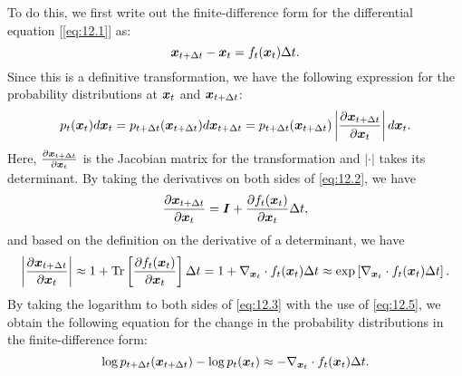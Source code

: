 To do this, we first write out the finite-difference form for the differential equation [\cref{eq:12.1}] as:
\begin{equation}
\label{eq:12.2}
\bm{x}_{t+\Delta t}-\bm{x}_t=f_t(\bm{x}_{t})\Delta t.
\end{equation}
Since this is a definitive transformation, we have the following expression for the probability distributions at $\bm{x}_{t}$ and $\bm{x}_{t+\Delta t}$:
\begin{equation}
    \label{eq:12.3}
    p_t(\bm{x}_{t})d\bm{x}_t=p_{t+\Delta t}(\bm{x}_{t+\Delta t})d\bm{x}_{t+\Delta t}=p_{t+\Delta t}(\bm{x}_{t+\Delta t}) \left\vert \frac{\partial \bm{x}_{t+\Delta t}}{\partial \bm{x}_{t}} \right\vert d\bm{x}_t.
\end{equation}
Here, $\frac{\partial \bm{x}_{t+\Delta t}}{\partial \bm{x}_{t}}$ is the Jacobian matrix for the transformation and $\vert\cdot\vert$ takes its determinant. By taking the derivatives on both sides of \cref{eq:12.2}, we have
\begin{equation}
    \label{eq:12.4}
    \frac{\partial \bm{x}_{t+\Delta t}}{\partial \bm{x}_{t}}=\bm{I}+\frac{\partial f_t(\bm{x}_{t})}{\partial \bm{x}_{t}}\Delta t,
\end{equation}
and based on the definition on the derivative of a determinant, we have
\begin{equation}
    \label{eq:12.5}
    \left\vert \frac{\partial \bm{x}_{t+\Delta t}}{\partial \bm{x}_{t}} \right\vert\approx 1+\mbox{Tr}\left[ \frac{\partial f_t(\bm{x}_{t})}{\partial \bm{x}_{t}}\right]\Delta t=1+\nabla_{\bm{x}_{t}}\cdot f_t(\bm{x}_{t})\Delta t\approx \exp\left[ \nabla_{\bm{x}_{t}}\cdot f_t(\bm{x}_{t})\Delta t\right].
\end{equation}
By taking the logarithm to both sides of \cref{eq:12.3} with the use of \cref{eq:12.5}, we obtain the following equation for the change in the probability distributions in the finite-difference form:
\begin{equation}
    \label{eq:12.6}
\log p_{t+\Delta t}(\bm{x}_{t+\Delta t}) -\log p_t(\bm{x}_{t}) \approx - \nabla_{\bm{x}_{t}} \cdot f_t(\bm{x}_{t})\Delta t.
\end{equation}

